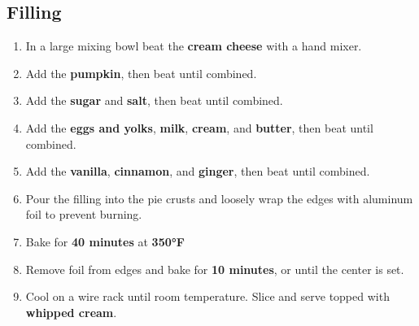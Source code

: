 \documentclass[11pt,letterpaper]{article}
\begin{document}
\subsection*{Filling}
\begin{enumerate}
	\item In a large mixing bowl beat the \textbf{cream cheese} with a hand mixer.
	\item Add the \textbf{pumpkin}, then beat until combined.
	\item Add the \textbf{sugar} and \textbf{salt}, then beat until combined.
	\item Add the \textbf{eggs and yolks}, \textbf{milk}, \textbf{cream}, and \textbf{butter}, then beat until combined.
	\item Add the \textbf{vanilla}, \textbf{cinnamon}, and \textbf{ginger}, then beat until combined.
	\item Pour the filling into the pie crusts and loosely wrap the edges with aluminum foil to prevent burning.
	\item Bake for \textbf{40 minutes} at \textbf{350°F}
	\item Remove foil from edges and bake for \textbf{10 minutes}, or until the center is set.
	\item Cool on a wire rack until room temperature. Slice and serve topped with \textbf{whipped cream}.
\end{enumerate}
\end{document}
